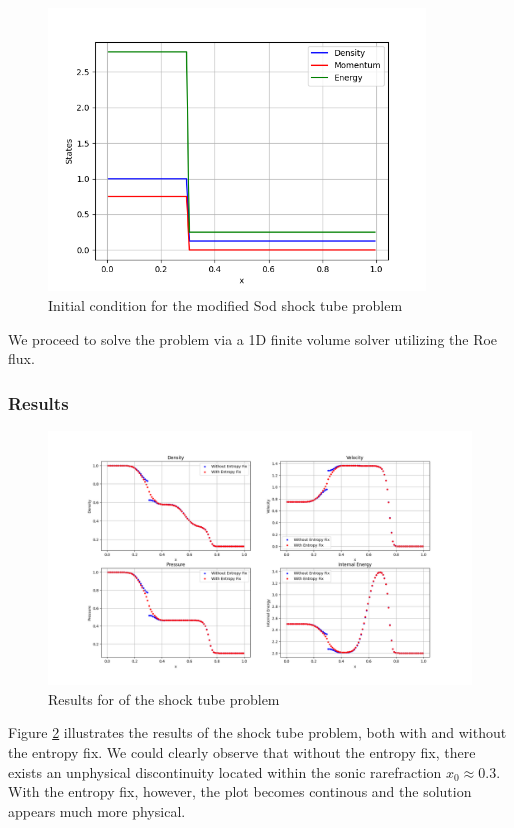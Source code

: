 \documentclass[a4paper]{article}
\numberwithin{equation}{section}
\begin{document}
\begin{figure}[H]
    \centering
    \includegraphics[width=10cm]{fig/InitialCondition.png}
    \caption{Initial condition for the modified Sod shock tube problem}
    \label{fig:ShockTubeInitialConditon}
\end{figure}
We proceed to solve the problem via a 1D finite volume solver utilizing the Roe flux.

\subsubsection{Results}
\begin{figure}[H]
    \centering
    \includegraphics[width=17cm]{fig/Sod_shock_tube_results.png}
    \caption{Results for of the shock tube problem}
    \label{fig:ShockTubeResults}
\end{figure}
Figure \ref{fig:ShockTubeResults} illustrates the results of the shock tube problem, both with and without the entropy fix. We could clearly observe that without the entropy fix, there exists an unphysical discontinuity located within the sonic rarefraction $x_0 \approx 0.3$. With the entropy fix, however, the plot becomes continous and the solution appears much more physical. 
\end{document}
